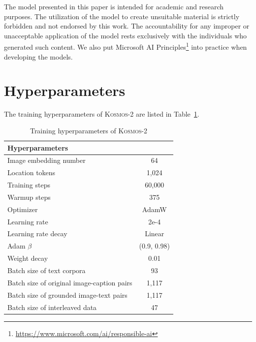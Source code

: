 \documentclass{article}
\newcommand\our{\textsc{Kosmos-2}}
\begin{document}
The model presented in this paper is intended for academic and research purposes.
The utilization of the model to create unsuitable material is strictly forbidden and not endorsed by this work.
The accountability for any improper or unacceptable application of the model rests exclusively with the individuals who generated such content.
We also put Microsoft AI Principles\footnote{\url{https://www.microsoft.com/ai/responsible-ai}} into practice when developing the models.





\nocite{cm3}
\nocite{blip2}

\newpage
\appendix

\section{Hyperparameters}
\label{app:hyperparam}


The training hyperparameters of \our{} are listed in Table~\ref{tbl:hyperparam:vl:pt:opt}.


\begin{table}[ht]
\centering
\small
\begin{tabular}{lc}
\toprule
\textbf{Hyperparameters} & \\ \midrule
Image embedding number & 64 \\
Location tokens & 1,024 \\
\midrule
Training steps   &       60,000 \\
Warmup steps     &       375 \\
Optimizer & AdamW \\
Learning rate & 2e-4 \\
Learning rate decay & Linear \\
Adam $\beta$ & (0.9, 0.98) \\
Weight decay & 0.01 \\
\midrule
Batch size of text corpora         &      93  \\
Batch size of original image-caption pairs  & 1,117 \\
Batch size of grounded image-text pairs  & 1,117 \\
Batch size of interleaved data   &    47    \\
\bottomrule
\end{tabular}
\vspace{0.2cm}
\caption{Training hyperparameters of \our{}}
\label{tbl:hyperparam:vl:pt:opt}
\end{table}
\end{document}
